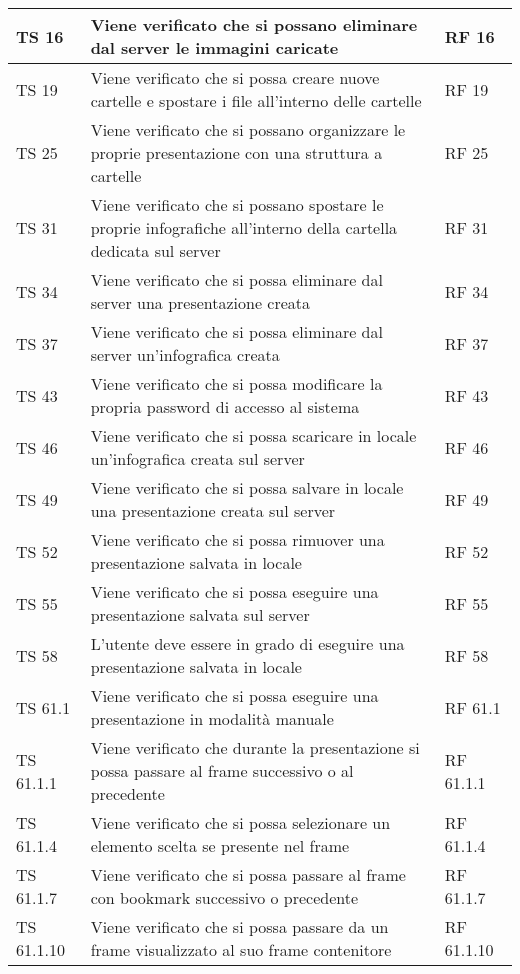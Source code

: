{{\begin{longtable} [c]{| p{3cm} | p{6cm} |p{3cm}|}
			\hline
			TS 16 & Viene verificato che si possano eliminare dal server le immagini caricate & RF 16\\
			\hline
			TS 19 & Viene verificato che si possa creare nuove cartelle e spostare i file all'interno delle cartelle & RF 19\\
			\hline
			TS 25 & Viene verificato che si possano organizzare le proprie presentazione con una struttura a cartelle & RF 25\\
			\hline
			TS 31 & Viene verificato che si possano spostare le proprie infografiche all'interno della cartella dedicata sul server & RF 31\\
			\hline
			TS 34 & Viene verificato che si possa eliminare dal server una presentazione creata & RF 34\\
			\hline
			TS 37 & Viene verificato che si possa eliminare dal server un'infografica creata & RF 37\\
			\hline
			TS 43 & Viene verificato che si possa modificare la propria password di accesso al sistema & RF 43\\
			\hline
			TS 46 & Viene verificato che si possa scaricare in locale un'infografica creata sul server & RF 46\\
			\hline
			TS 49 & Viene verificato che si possa salvare in locale una presentazione creata sul server & RF 49\\
			\hline
			TS 52 & Viene verificato che si possa rimuover una presentazione salvata in locale & RF 52\\
			\hline
			TS 55 & Viene verificato che si possa eseguire una presentazione salvata sul server & RF 55\\
			\hline
			TS 58 & L'utente deve essere in grado di eseguire una presentazione salvata in locale & RF 58\\
			\hline
			TS 61.1 & Viene verificato che si possa eseguire una presentazione in modalità manuale & RF 61.1\\
			\hline
			TS 61.1.1 & Viene verificato che durante la presentazione si possa passare al frame successivo o al precedente & RF 61.1.1\\
			\hline
			TS 61.1.4 & Viene verificato che si possa selezionare un elemento scelta se presente nel frame & RF 61.1.4\\
			\hline
			TS 61.1.7 & Viene verificato che si possa passare al frame con bookmark successivo o precedente & RF 61.1.7\\
			\hline
			TS 61.1.10 & Viene verificato che si possa passare da un frame visualizzato al suo frame contenitore & RF 61.1.10\\

\end{longtable}}}
